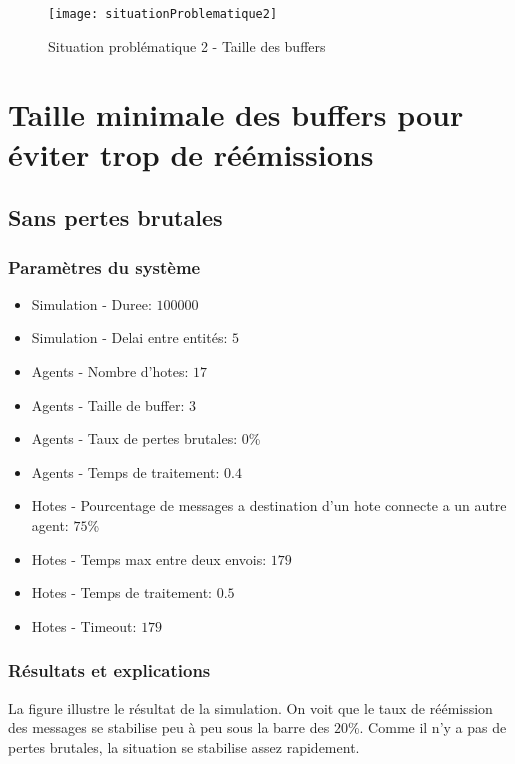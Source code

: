 \documentclass[a4paper,11pt]{article}
\begin{document}
\begin{figure}[h!t]
  \centering
    \texttt{[image: situationProblematique2]}
  \caption{Situation problématique 2 - Taille des buffers}
  \label{fig:situationproblematique2}
\end{figure}










\section{Taille minimale des buffers pour éviter trop de réémissions}
\subsection{Sans pertes brutales}
\subsubsection{Paramètres du système}
\begin{itemize}
 \item Simulation - Duree: $100000$
 \item Simulation - Delai entre entités: $5$
 \item Agents - Nombre d'hotes: $17$
 \item Agents - Taille de buffer: \textbf{$3$}
 \item Agents - Taux de pertes brutales: $0$\%
 \item Agents - Temps de traitement: $0.4$
 \item Hotes - Pourcentage de messages a destination d'un hote connecte a un autre agent: $75$\%
 \item Hotes - Temps max entre deux envois: $179$
 \item Hotes - Temps de traitement: $0.5$
 \item Hotes - Timeout: $179$
\end{itemize}






\subsubsection{Résultats et explications}
La figure  illustre le résultat de la simulation. On voit que le taux de réémission des messages se stabilise peu à peu sous la barre des $20$\%. Comme il n'y a pas de pertes brutales, la situation se stabilise assez rapidement.
\end{document}
